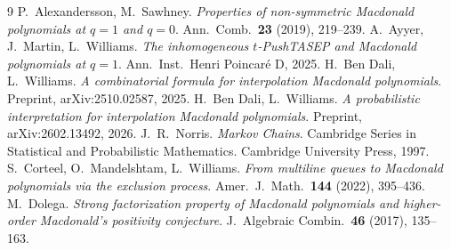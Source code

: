 \begin{thebibliography}{9}
 P.~Alexandersson, M.~Sawhney.
  \emph{Properties of non-symmetric Macdonald polynomials at $q=1$ and $q=0$}.
  Ann.\ Comb.\ \textbf{23} (2019), 219--239.
 A.~Ayyer, J.~Martin, L.~Williams.
  \emph{The inhomogeneous $t$-PushTASEP and Macdonald polynomials at $q=1$}.
  Ann.\ Inst.\ Henri Poincar\'e D, 2025.
 H.~Ben Dali, L.~Williams.
  \emph{A combinatorial formula for interpolation Macdonald polynomials}.
  Preprint, arXiv:2510.02587, 2025.
 H.~Ben Dali, L.~Williams.
  \emph{A probabilistic interpretation for interpolation Macdonald polynomials}.
  Preprint, arXiv:2602.13492, 2026.
 J.~R.~Norris.
  \emph{Markov Chains}. Cambridge Series in Statistical and Probabilistic
  Mathematics. Cambridge University Press, 1997.
 S.~Corteel, O.~Mandelshtam, L.~Williams.
  \emph{From multiline queues to Macdonald polynomials via the exclusion process}.
  Amer.\ J.\ Math.\ \textbf{144} (2022), 395--436.
 M.~Dolega.
  \emph{Strong factorization property of Macdonald polynomials and higher-order
  Macdonald's positivity conjecture}.
  J.\ Algebraic Combin.\ \textbf{46} (2017), 135--163.
\end{thebibliography}

\endgroup
